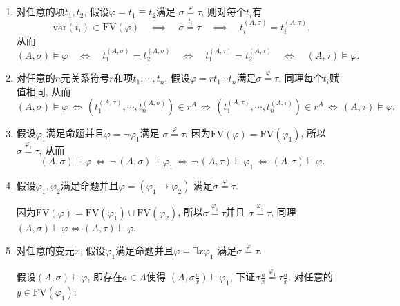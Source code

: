 \documentclass[UTF8]{ctexart}
\begin{document}
\begin{enumerate}
    \item 对任意的项$t_1,t_2$, 假设$\varphi=t_1\equiv t_2$满足
    $\sigma\overset{\displaystyle\varphi}{=}\tau$, 则对每个$t_i$有
    \[
        \mathrm{var}(t_i)\subset\mathrm{FV}(\varphi)
        \quad\implies\quad\sigma\overset{\displaystyle t_i}{=}\tau
        \quad\implies\quad t_i^{(A,\sigma)}=t_i^{(A,\tau)},
    \]
    从而
    \[
        (A,\sigma)\models\varphi\quad\iff\quad
        t_1^{(A,\sigma)}=t_2^{(A,\sigma)}\quad\iff\quad
        t_1^{(A,\tau)}=t_2^{(A,\tau)}\quad\iff\quad(A,\tau)\models\varphi.
    \]

    \item 对任意的$n$元关系符号$r$和项$t_1,\cdots,t_n$,
    假设$\varphi=rt_1\cdots t_n$满足$\sigma\overset{\displaystyle\varphi}{=}\tau$.
    同理每个$t_i$赋值相同, 从而
    \[
        (A,\sigma)\models\varphi\,\iff\,
        (t_1^{(A,\sigma)},\cdots,t_n^{(A,\sigma)})\in r^A\,\iff\,
        (t_1^{(A,\tau)},\cdots,t_n^{(A,\tau)})\in r^A\,\iff\,
        (A,\tau)\models\varphi.
    \]

    \item 假设$\varphi_1$满足命题并且$\varphi=\neg\varphi_1$满足
    $\sigma\overset{\displaystyle\varphi}{=}\tau$.
    因为$\mathrm{FV}(\varphi)=\mathrm{FV}(\varphi_1)$, 所以
    $\sigma\overset{\displaystyle\varphi_1}{=}\tau$, 从而
    \[
        (A,\sigma)\models\varphi\,\iff\,\neg\,(A,\sigma)\models\varphi_1\,\iff\,
        \neg\,(A,\tau)\models\varphi_1\,\iff\,(A,\tau)\models\varphi.
    \]

    \item 假设$\varphi_1,\varphi_2$满足命题并且$\varphi=(\varphi_1\to\varphi_2)$
    满足$\sigma\overset{\displaystyle\varphi}{=}\tau$.
    
    \vspace{3pt}\hspace{2.17em}
    因为$\mathrm{FV}(\varphi)=\mathrm{FV}(\varphi_1)\cup\mathrm{FV}(\varphi_2)$,
    所以$\sigma\overset{\displaystyle\varphi_1}{=}\tau$并且
    $\sigma\overset{\displaystyle\varphi_2}{=}\tau$, 同理
    $(A,\sigma)\models\varphi\iff(A,\tau)\models\varphi$.

    \vspace{3pt}
    \item 对任意的变元$x$, 假设$\varphi_1$满足命题并且$\varphi=\exists x\varphi_1$
    满足$\sigma\overset{\displaystyle\varphi}{=}\tau$.

    \vspace{3pt}\hspace{2.17em}
    假设$(A,\sigma)\models\varphi$, 即存在$a\in A$使得
    $\displaystyle\left(A,\sigma\frac{a}{x}\right)\models\varphi_1$,
    下证$\displaystyle\sigma\frac{a}{x}\overset{\displaystyle\varphi_1}{=}
    \tau\frac{a}{x}$. 对任意的$y\in\mathrm{FV}(\varphi_1)$:


\end{enumerate}
\end{document}
